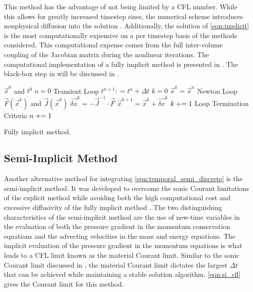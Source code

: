 This method has the advantage of not being limited by a CFL number.
While this allows for greatly increased timestep sizes, the numerical scheme introduces nonphysical diffusion into the solution \cite{Mahaffy1993}.
Additionally, the solution of \eqref{eqn:implicit} is the most computationally expensive on a per timestep basis of the methods considered.
This computational expense comes from the full inter-volume coupling of the Jacobian matrix during the nonlinear iterations.
The computational implementation of a fully implicit method is presented in .
The black-box step in  will be discussed in .

\begin{algo}[ht!]
\setlength{\baselineskip}{0.625\baselineskip}
\begin{algorithmic}[1]
\Require $\vec{x}^{0}$ and $t^{0}$
\Set $n = 0$
\Loop \; Transient Loop
    \Set $t^{n+1} : = t^{n} + \Delta t$
    \Set $k = 0$
    \Set $\vec{x}^{k} = \vec{x}^{n}$
    \Loop \; Newton Loop
		\Calculate $\vec{F}(\vec{x}^{k})$ and $\vec{J}(\vec{x}^{k})$
		\Calculate $\vec{\delta x}^k = - \vec{J}^{-1}\cdot\vec{F}$
		\Calculate $\vec{x}^{k+1} = \vec{x}^{k} + \vec{\delta x}^{k}$
		\Set $k \mathrel{+}= 1$
		\BlackBox Loop Termination Criteria
	\EndLoop	
	\Set $n \mathrel{+}= 1$
\EndLoop
\end{algorithmic}
\caption{Fully implicit method.}
\label{algo:implicit}
\end{algo}

\subsection{Semi-Implicit Method}
\label{subsect:semi_implicit}

Another alternative method for integrating \eqref{eqn:temporal_semi_discrete} is the semi-implicit method.
It was developed to overcome the sonic Courant limitations of the explicit method while avoiding both the high computational cost and excessive diffusivity of the fully implicit method \cite{Liles1978}.
The two distinguishing characteristics of the semi-implicit method are the use of new-time variables in the evaluation of both the pressure gradient in the momentum conservation equations and the advecting velocities in the mass and energy equations. 
The implicit evaluation of the pressure gradient in the momentum equations is what leads to a CFL limit known as the material Courant limit.
Similar to the sonic Courant limit discussed in , the material Courant limit dictates the largest $\Delta t$ that can be achieved while maintaining a stable solution algorithm.
\eqref{eqn:si_cfl} gives the Courant limit for this method.

